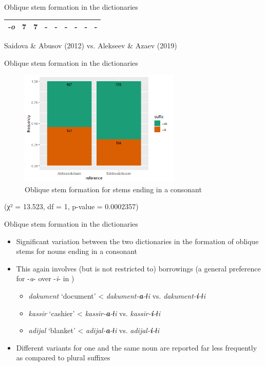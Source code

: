 \begin{frame}{Oblique stem formation in the dictionaries}
\begin{table}[]
\begin{tabular}{|c|c|c|c|c|c|c|c|c|}
\textit{-o} & {\color[HTML]{1B9045} 7}   & {\color[HTML]{CE6301} 7}   & {\color[HTML]{1B9045} -}            & {\color[HTML]{CE6301} -}            & {\color[HTML]{1B9045} -}            & {\color[HTML]{CE6301} -}            & {\color[HTML]{1B9045} -}  & {\color[HTML]{CE6301} -}  \\ \hline
\end{tabular}
\end{table}
\centering
\small {\color[HTML]{1B9045} Saidova \& Abusov (2012)} vs. {\color[HTML]{CE6301} Alekseev \& Azaev (2019)}
\end{frame}

\begin{frame}{Oblique stem formation in the dictionaries}
\begin{figure}[h]
\centering
\caption{Oblique stem formation for stems ending in a consonant}
\includegraphics[height=5.5cm]{images/genitive.png}
\end{figure}
\centering
\small (χ² = 13.523, df = 1, p-value = 0.0002357)
\end{frame}

\begin{frame}{Oblique stem formation in the dictionaries}
\begin{itemize}
    \item Significant variation between the two dictionaries in the formation of oblique stems for nouns ending in a consonant
    \item This again involves (but is not restricted to) borrowings (a general preference for -\textit{a}- over -\textit{i}- in \citet{saidovaabusov2012})
    \begin{itemize}
        \item \textit{dakument} `document' < \textit{dakument-\textbf{a}-ɬi} vs. \textit{dakument-\textbf{i}-ɬi}
        \item \textit{kassir} `cashier' < \textit{kassir-\textbf{a}-ɬi} vs. \textit{kassir-\textbf{i}-ɬi} 
        \item \textit{adijal} `blanket' < \textit{adijal-\textbf{a}-ɬi} vs. \textit{adijal-\textbf{i}-ɬi} 
    \end{itemize}
    \item Different variants for one and the same noun are reported far less frequently as compared to plural suffixes
\end{itemize}
\end{frame}

